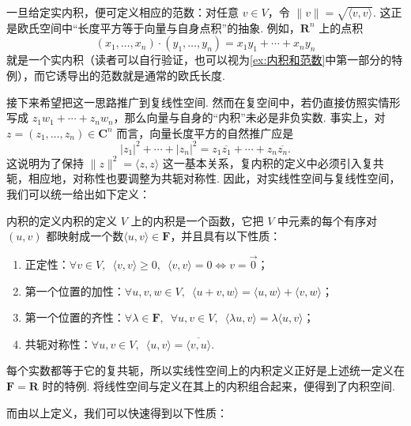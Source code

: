 一旦给定实内积，便可定义相应的范数：对任意 $v \in V$，令 $\lVert v \rVert = \sqrt{\langle v, v \rangle}$. 这正是欧氏空间中``长度平方等于向量与自身点积''的抽象. 例如，$\mathbf{R}^{n}$ 上的点积
\[
    (x_1, \ldots, x_n) \cdot (y_1, \ldots, y_n) = x_1 y_1 + \cdots + x_n y_n
\]
就是一个实内积（读者可以自行验证，也可以视为\autoref{ex:内积和范数}中第一部分的特例），而它诱导出的范数就是通常的欧氏长度.

接下来希望把这一思路推广到复线性空间. 然而在复空间中，若仍直接仿照实情形写成 $z_1w_1 + \cdots + z_nw_n$，那么向量与自身的``内积''未必是非负实数. 事实上，对 $z = (z_1, \ldots, z_n) \in \mathbf{C}^{n}$ 而言，向量长度平方的自然推广应是
\[
    \lvert z_1 \rvert^2 + \cdots + \lvert z_n \rvert^2 = z_1 \overline{z_1} + \cdots + z_n \overline{z_n}.
\]
这说明为了保持 $\lVert z \rVert^2 = \langle z, z \rangle$ 这一基本关系，复内积的定义中必须引入复共轭，相应地，对称性也要调整为共轭对称性. 因此，对实线性空间与复线性空间，我们可以统一给出如下定义：

\begin{definition}{内积的定义}{内积的定义}
$V$ 上的内积是一个函数，它把 $ V $ 中元素的每个有序对 $(u, v)$ 都映射成一个数$ \langle u, v \rangle \in \mathbf{F}$，并且具有以下性质：

\begin{enumerate}
    \item 正定性：$\forall v \in V, \enspace \langle v, v \rangle \geqslant 0, \enspace \langle v, v \rangle = 0 \iff v = \vec{0}$；

    \item 第一个位置的加性：$\forall u, v, w \in V, \enspace \langle u + v, w \rangle = \langle u, w \rangle + \langle v, w \rangle$；

    \item 第一个位置的齐性：$\forall \lambda \in \mathbf{F}, \enspace \forall u, v \in V, \enspace \langle \lambda u, v \rangle = \lambda \langle u, v \rangle$；

    \item 共轭对称性：$\forall u, v \in V, \enspace \langle u, v \rangle = \overline{\langle v, u \rangle}$. %
\end{enumerate}
\end{definition}

每个实数都等于它的复共轭，所以实线性空间上的内积定义正好是上述统一定义在 $\mathbf{F} = \mathbf{R}$ 时的特例. 将线性空间与定义在其上的内积组合起来，便得到了内积空间.

而由以上定义，我们可以快速得到以下性质：


